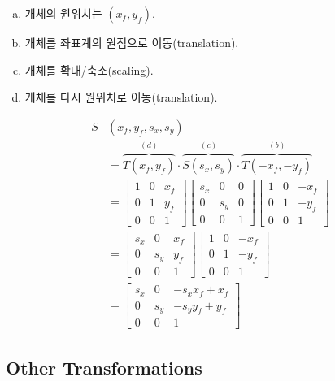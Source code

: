 \begin{enumerate}[(a)]
  \item 개체의 원위치는 $(x_f, y_f)$.
  \item 개체를 좌표계의 원점으로 이동(translation).
  \item 개체를 확대/축소(scaling).
  \item 개체를 다시 원위치로 이동(translation).
\end{enumerate}
$$
\begin{aligned}
  S&(x_f, y_f, s_x, s_y) \\
  &= \overbrace{T(x_f, y_f)}^{(d)} \cdot \overbrace{S(s_x, s_y)}^{(c)} \cdot \overbrace{T(-x_f, -y_f)}^{(b)} \\
  &=
  \begin{bmatrix}
    1 & 0 & x_f \\
    0 & 1 & y_f \\
    0 & 0 & 1
  \end{bmatrix}
  \begin{bmatrix}
    s_x & 0 & 0  \\
    0 & s_y & 0 \\
    0 & 0 & 1
  \end{bmatrix}
  \begin{bmatrix}
    1 & 0 & -x_f \\
    0 & 1 & -y_f \\
    0 & 0 & 1
  \end{bmatrix} \\
  &=
  \begin{bmatrix}
    s_x & 0 & x_f \\
    0 & s_y & y_f \\
    0 & 0 & 1
  \end{bmatrix}
  \begin{bmatrix}
    1 & 0 & -x_f \\
    0 & 1 & -y_f \\
    0 & 0 & 1
  \end{bmatrix} \\
  &=
  \begin{bmatrix}
    s_x & 0 & -s_x x_f + x_f \\
    0 & s_y & -s_y y_f + y_f \\
    0 & 0 & 1
  \end{bmatrix}
\end{aligned}
$$

\subsection{Other Transformations}

